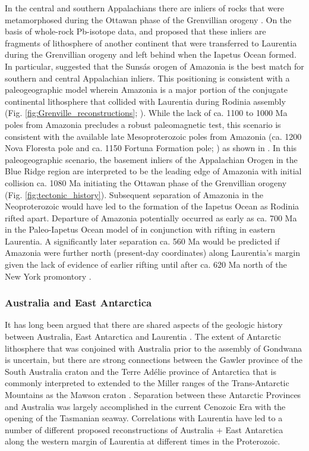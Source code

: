 \documentclass[twocolumn, switch]{article} %
\begin{document}
In the central and southern Appalachians there are inliers of rocks that were metamorphosed during the Ottawan phase of the Grenvillian orogeny \citep{McLelland2013a}. On the basis of whole-rock Pb-isotope data, \cite{Loewy2003a} and \cite{Fisher2010a} proposed that these inliers are fragments of lithosphere of another continent that were transferred to Laurentia during the Grenvillian orogeny and left behind when the Iapetus Ocean formed. In particular, \cite{Fisher2010a} suggested that the Suns\'as orogen of Amazonia is the best match for southern and central Appalachian inliers. This positioning is consistent with a paleogeographic model wherein Amazonia is a major portion of the conjugate continental lithosphere that collided with Laurentia during Rodinia assembly (Fig. \ref{fig:Grenville_reconstructions}; \citealp{Hoffman1991a, Evans2013b, Cawood2017a}). While the lack of ca. 1100 to 1000 Ma poles from Amazonia precludes a robust paleomagnetic test, this scenario is consistent with the available late Mesoproterozoic poles from Amazonia (ca. 1200 Nova Floresta pole and ca. 1150 Fortuna Formation pole; \citealp{DAgrella-Filho2021a}) as shown in \cite{Evans2013b}. In this paleogeographic scenario, the basement inliers of the Appalachian Orogen in the Blue Ridge region are interpreted to be the leading edge of Amazonia with initial collision ca. 1080 Ma initiating the Ottawan phase of the Grenvillian orogeny (Fig. \ref{fig:tectonic_history}). Subsequent separation of Amazonia in the Neoproterozoic would have led to the formation of the Iapetus Ocean as Rodinia rifted apart. Departure of Amazonia potentially occurred as early as ca. 700 Ma in the Paleo-Iapetus Ocean model of \citet{Robert2020a} in conjunction with rifting in eastern Laurentia. A significantly later separation ca. 560 Ma would be predicted if Amazonia were further north (present-day coordinates) along Laurentia's margin given the lack of evidence of earlier rifting until after ca. 620 Ma north of the New York promontory \citep{Allen2010a}.

\subsubsection{Australia and East Antarctica}

It has long been argued that there are shared aspects of the geologic history between Australia, East Antarctica and Laurentia \citep{Moores1991a}. The extent of Antarctic lithosphere that was conjoined with Australia prior to the assembly of Gondwana is uncertain, but there are strong connections between the Gawler province of the South Australia craton and the Terre Ad\'elie province of Antarctica that is commonly interpreted to extended to the Miller ranges of the Trans-Antarctic Mountains as the Mawson craton \citep{Payne2009b}.  Separation between these Antarctic Provinces and Australia was largely accomplished in the current Cenozoic Era with the opening of the Tasmanian seaway. Correlations with Laurentia have led to a number of different proposed reconstructions of Australia + East Antarctica along the western margin of Laurentia at different times in the Proterozoic.
\end{document}

